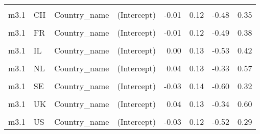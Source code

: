 \begin{table}
\begin{tabular}[t]{llllrrrr}
\cellcolor{gray!10}{m3.1} & \cellcolor{gray!10}{CA} & \cellcolor{gray!10}{Country\_name} & \cellcolor{gray!10}{EPS} & \cellcolor{gray!10}{-0.06} & \cellcolor{gray!10}{0.07} & \cellcolor{gray!10}{-0.20} & \cellcolor{gray!10}{0.09}\\
m3.1 & CH & Country\_name & (Intercept) & -0.01 & 0.12 & -0.48 & 0.35\\
\cellcolor{gray!10}{m3.1} & \cellcolor{gray!10}{CH} & \cellcolor{gray!10}{Country\_name} & \cellcolor{gray!10}{EPS} & \cellcolor{gray!10}{-0.04} & \cellcolor{gray!10}{0.06} & \cellcolor{gray!10}{-0.18} & \cellcolor{gray!10}{0.11}\\
m3.1 & FR & Country\_name & (Intercept) & -0.01 & 0.12 & -0.49 & 0.38\\
\cellcolor{gray!10}{m3.1} & \cellcolor{gray!10}{FR} & \cellcolor{gray!10}{Country\_name} & \cellcolor{gray!10}{EPS} & \cellcolor{gray!10}{-0.04} & \cellcolor{gray!10}{0.06} & \cellcolor{gray!10}{-0.19} & \cellcolor{gray!10}{0.10}\\
m3.1 & IL & Country\_name & (Intercept) & 0.00 & 0.13 & -0.53 & 0.42\\
\cellcolor{gray!10}{m3.1} & \cellcolor{gray!10}{IL} & \cellcolor{gray!10}{Country\_name} & \cellcolor{gray!10}{EPS} & \cellcolor{gray!10}{0.00} & \cellcolor{gray!10}{0.12} & \cellcolor{gray!10}{-0.30} & \cellcolor{gray!10}{0.28}\\
m3.1 & NL & Country\_name & (Intercept) & 0.04 & 0.13 & -0.33 & 0.57\\
\cellcolor{gray!10}{m3.1} & \cellcolor{gray!10}{NL} & \cellcolor{gray!10}{Country\_name} & \cellcolor{gray!10}{EPS} & \cellcolor{gray!10}{0.09} & \cellcolor{gray!10}{0.06} & \cellcolor{gray!10}{-0.07} & \cellcolor{gray!10}{0.24}\\
m3.1 & SE & Country\_name & (Intercept) & -0.03 & 0.14 & -0.60 & 0.32\\
\cellcolor{gray!10}{m3.1} & \cellcolor{gray!10}{SE} & \cellcolor{gray!10}{Country\_name} & \cellcolor{gray!10}{EPS} & \cellcolor{gray!10}{-0.10} & \cellcolor{gray!10}{0.07} & \cellcolor{gray!10}{-0.26} & \cellcolor{gray!10}{0.06}\\
m3.1 & UK & Country\_name & (Intercept) & 0.04 & 0.13 & -0.34 & 0.60\\
\cellcolor{gray!10}{m3.1} & \cellcolor{gray!10}{UK} & \cellcolor{gray!10}{Country\_name} & \cellcolor{gray!10}{EPS} & \cellcolor{gray!10}{0.09} & \cellcolor{gray!10}{0.07} & \cellcolor{gray!10}{-0.06} & \cellcolor{gray!10}{0.25}\\
m3.1 & US & Country\_name & (Intercept) & -0.03 & 0.12 & -0.52 & 0.29\\

\end{tabular}
\end{table}
